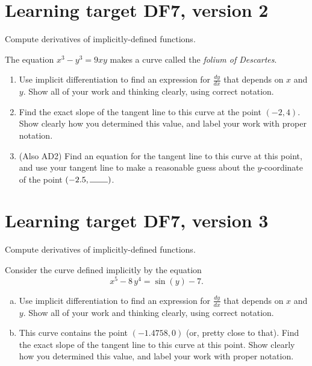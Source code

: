 \pagebreak

\section{Learning target DF7, version 2}

Compute derivatives of implicitly-defined functions.

\hrulefill

The equation \(x^{3}-y^{3}=9xy\) makes a curve called the \textit{folium of Descartes}.

\begin{enumerate}
	\item Use implicit differentiation to find an expression for $\frac{dy}{dx}$ that depends on $x$ and $y$.  Show all of your work and thinking clearly, using correct notation.

	\vfill

	\item Find the exact slope of the tangent line to this curve at the point \((-2, 4)\). Show clearly how you determined this value, and label your work with proper notation.

	\vfill

	\item (Also AD2) Find an equation for the tangent line to this curve at this point, and use your tangent line to make a reasonable guess about the $y$-coordinate of the point $(-2.5, \rule{0.75cm}{0.15mm} )$.
	\vspace{1in}
\end{enumerate}

\pagebreak

\section{Learning target DF7, version 3}

Compute derivatives of implicitly-defined functions.

\hrulefill

Consider the curve defined implicitly by the equation
\[x^5 - 8\, y^4 = \sin\left(y\right) - 7.\]

\begin{enumerate}[(a)]
	\item Use implicit differentiation to find an expression for $\frac{dy}{dx}$ that depends on $x$ and $y$.  Show all of your work and thinking clearly, using correct notation.

	\vfill

	\item This curve contains the point \((-1.4758, 0)\) (or, pretty close to that). Find the exact slope of the tangent line to this curve at this point. Show clearly how you determined this value, and label your work with proper notation.

	\vfill
\end{enumerate}

